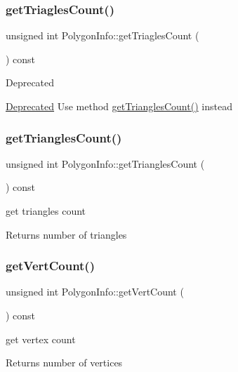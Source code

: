 \subsubsection{\texorpdfstring{get\+Triagles\+Count()}{getTriaglesCount()}}
{\footnotesize\ttfamily unsigned int Polygon\+Info\+::get\+Triagles\+Count (\begin{DoxyParamCaption}{ }\end{DoxyParamCaption}) const}

\begin{DoxyRefDesc}{Deprecated}
\item[\hyperlink{deprecated__deprecated000023}{Deprecated}]Use method \hyperlink{group____2d_ga0ca8e8c33d34a16c1f8cf33d13aeea2b}{get\+Triangles\+Count()} instead \end{DoxyRefDesc}
\mbox{\label{group____2d_ga0ca8e8c33d34a16c1f8cf33d13aeea2b}} 
\subsubsection{\texorpdfstring{get\+Triangles\+Count()}{getTrianglesCount()}}
{\footnotesize\ttfamily unsigned int Polygon\+Info\+::get\+Triangles\+Count (\begin{DoxyParamCaption}{ }\end{DoxyParamCaption}) const}

get triangles count \begin{DoxyReturn}{Returns}
number of triangles 
\end{DoxyReturn}
\mbox{\label{group____2d_ga266fe3f8a962c0281b381ad1a55835bd}} 
\subsubsection{\texorpdfstring{get\+Vert\+Count()}{getVertCount()}}
{\footnotesize\ttfamily unsigned int Polygon\+Info\+::get\+Vert\+Count (\begin{DoxyParamCaption}{ }\end{DoxyParamCaption}) const}

get vertex count \begin{DoxyReturn}{Returns}
number of vertices 
\end{DoxyReturn}
\mbox{\label{group____2d_gac59eef974273313c2393f4098f2d8345}} 
